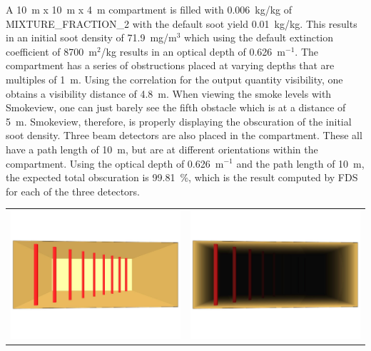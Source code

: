 \documentclass[11pt]{book}
\begin{document}
A 10~m x 10~m x 4~m compartment is filled with 0.006~kg/kg of {\ct MIXTURE\_FRACTION\_2} with the default soot yield
0.01~kg/kg.  This results in an initial soot density of 71.9~mg/m$^3$ which using the default extinction coefficient of
8700~m$^2$/kg results in an optical depth of 0.626~m$^{-1}$.  The compartment has a series of obstructions placed at varying depths that are
multiples of 1~m.  Using the correlation for the output quantity {\ct visibility}, one obtains a visibility distance of 4.8~m.
When viewing the smoke levels with Smokeview, one can just barely see the fifth obstacle which is at a distance of 5~m.
Smokeview, therefore, is properly displaying the obscuration of the initial soot density.  Three beam detectors are also
placed in the compartment.  These all have a path length of 10~m, but are at different orientations within the compartment.
Using the optical depth of 0.626~m$^{-1}$ and the path length of 10~m, the expected total obscuration is 99.81~\%, which is the
result computed by FDS for each of the three detectors.
\begin{tabular*}{\textwidth}{lr}
\includegraphics[width=3.2in]{FIGURES/beam_detector_nosmoke} &
\includegraphics[width=3.2in]{FIGURES/beam_detector_smoke}
\end{tabular*}

\clearpage
\end{document}
